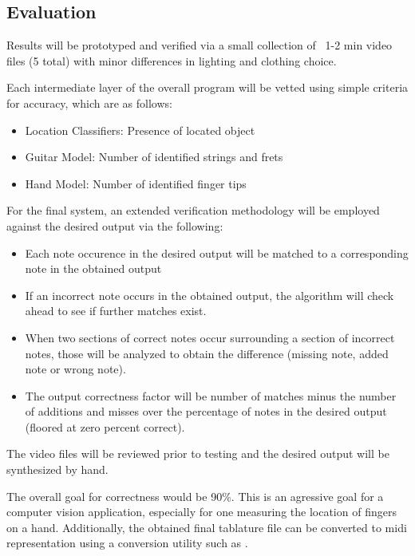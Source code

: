 \subsection{Evaluation}
Results will be prototyped and verified via a small collection of ~1-2 min video files
(5 total) with minor differences in lighting and clothing choice.
\par
Each intermediate layer of the overall program will be vetted using simple criteria
for accuracy, which are as follows:
\begin{itemize}
    \item Location Classifiers: Presence of located object
    \item Guitar Model: Number of identified strings and frets
    \item Hand Model: Number of identified finger tips
\end{itemize}
For the final system, an extended verification methodology will be employed against the desired output via the following:
\begin{itemize}
    \item Each note occurence in the desired output will be matched to a corresponding note in the obtained output
    \item If an incorrect note occurs in the obtained output, the algorithm will check ahead to see if further
        matches exist.
    \item When two sections of correct notes occur surrounding a section of incorrect notes, those will
        be analyzed to obtain the difference (missing note, added note or wrong note).
    \item The output correctness factor will be number of matches minus the number of additions and misses
        over the percentage of notes in the desired output (floored at zero percent correct).
\end{itemize}
The video files will be reviewed prior to testing and the desired output will be synthesized by hand.
\par
The overall goal for correctness would be 90\%.
This is an agressive goal for a computer vision application,
especially for one measuring the location of fingers on a hand.
Additionally, the obtained final tablature file can be converted to midi representation
using a conversion utility such as \cite{8notes}.
